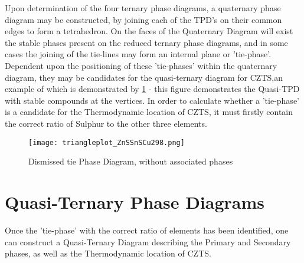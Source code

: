 Upon determination of the four ternary phase diagrams, a quaternary phase diagram may be constructed, by joining each of the TPD's on their common edges to form a tetrahedron. On the faces of the Quaternary Diagram will exist the stable phases present on the reduced ternary phase diagrams, and in some cases the joining of the tie-lines may form an internal plane or 'tie-phase'. Dependent upon the positioning of these 'tie-phases' within the quaternary diagram, they may be candidates for the quasi-ternary diagram for CZTS,an example of which is demonstrated by \ref{fig:ZnSSnSCu} - this figure demonstrates the Quasi-TPD with stable compounds at the vertices. In order to calculate whether a 'tie-phase' is a candidate for  the Thermodynamic location of CZTS, it must firstly contain the correct ratio of Sulphur to the other three elements. 

\begin{figure}[ht]
\centering
    \texttt{[image: triangleplot\_ZnSSnSCu298.png]}
\caption{Dismissed tie Phase Diagram, without associated phases}
\label{fig:ZnSSnSCu}
\end{figure}



\section{Quasi-Ternary Phase Diagrams}

Once the 'tie-phase' with the correct ratio of elements has been identified, one can construct a Quasi-Ternary Diagram describing the Primary and Secondary phases, as well as the Thermodynamic location of CZTS.

